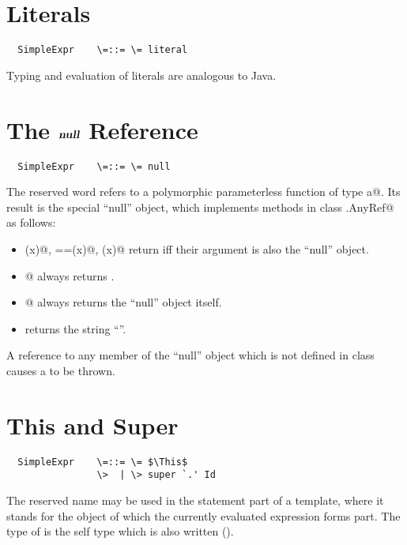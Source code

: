\documentclass[11pt]{report}
\newcommand{\ifqualified}[1]{}
\begin{document}
\section{Literals}

\syntax\begin{verbatim}
  SimpleExpr    \=::= \= literal
\end{verbatim}

Typing and evaluation of literals are analogous to Java.

\section{The $\mbox{\sl\bfseries null}$ Reference}

\syntax\begin{verbatim}
  SimpleExpr    \=::= \= null
\end{verbatim}

The reserved word \verb@null@ refers to a polymorphic parameterless
function of type a@. Its result is the
special ``null'' object, which implements methods in class
\verb@scala.AnyRef@ as follows:
\begin{itemize}
\item[]
\verb@eq(x)@, \verb@==(x)@, \verb@equals(x)@ return \verb@True@ iff their
argument \verb@x@ is also the ``null'' object.
\item[]
\verb@is[T]@ always returns \verb@False@.
\item[]
\verb@as[T]@ always returns the ``null'' object itself.
\item[]
\verb@toString@ returns the string ``\verb@null@''.
\end{itemize}
A reference to any member of the ``null'' object which is not defined in class
\verb@Object@ causes a \verb@NullPointerException@ to be thrown.

\section{This and Super}
\label{sec:this-super}

\syntax\begin{verbatim}
  SimpleExpr    \=::= \= $\This$
                \>  | \> super `.' Id
\end{verbatim}
\ifqualified{
  Super       \>::= \> $\SUPER$
	      \>  | \> `(' $\SUPER$ `:' Type `)'
}
The reserved name \verb@this@ may be used in the statement part of a
template, where it stands for the object of which the currently
evaluated expression forms part. The type of \verb@this@ is the self
type which is also written \verb@this@ ().
\end{document}
